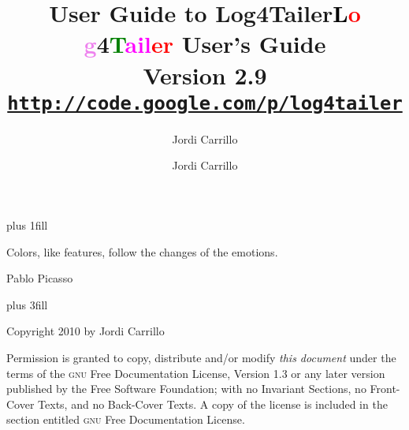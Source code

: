\documentclass[a4paper]{article}
\author{Jordi Carrillo}
\title{User Guide to Log4Tailer}
\newcommand{\logftailer}{\textbf{\textcolor{black}{L}\textcolor{red}{o}%
\textcolor{Violet}{g}4\textcolor{green}{T}\textcolor{magenta}{ail}\textcolor{red}{er}}}
\newcommand{\contentsrule}[1]{{\color{blue}\sectionrule{3ex}{3pt}{-2ex}{1pt}{#1}}}
\begin{document}


\newpage
\pagecolor{white}

\vbox{}
\vskip0pt plus 1fill
\epigraph{Colors, like features, follow the changes of the emotions.}{Pablo Picasso}
 \vskip0pt plus 3fill

\noindent
Copyright 2010 by Jordi Carrillo

\medskip
\noindent 
Permission is granted to copy, distribute and/or modify \emph{this document}
under the terms of the \textsc{gnu} Free Documentation License, Version 1.3
or any later version published by the Free Software Foundation;
with no Invariant Sections, no Front-Cover Texts, and no Back-Cover Texts.
A copy of the license is included in the section entitled \textsc{gnu}
Free Documentation License.


\vbox{}
\newpage


\title{{\bfseries \logftailer{} User's Guide}\\[1mm]
  \large Version 2.9\\[1mm]
\large\href{http://code.google.com/p/log4tailer}{\texttt{http://code.google.com/p/log4tailer}}}
\author{Jordi Carrillo}

\maketitle

\tableofcontents

\newpage



%

\end{document}
